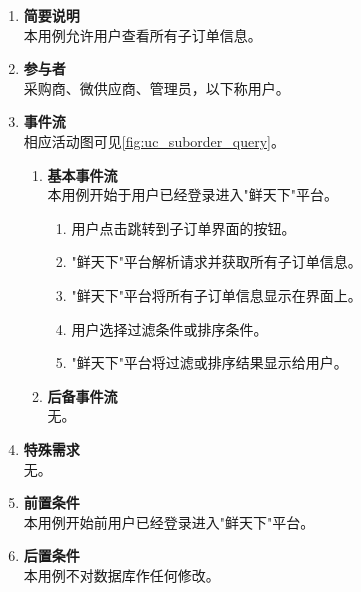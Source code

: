 \begin{enumerate}
    \item \textbf{简要说明}  \\ 本用例允许用户查看所有子订单信息。
    \item \textbf{参与者} \\ 采购商、微供应商、管理员，以下称用户。
    \item \textbf{事件流} \\ 相应活动图可见\autoref{fig:uc_suborder_query}。
    \begin{enumerate} 
        \item \textbf{基本事件流} \\ 本用例开始于用户已经登录进入"鲜天下"平台。
        \begin{enumerate}
            \item 用户点击跳转到子订单界面的按钮。

            \item "鲜天下"平台解析请求并获取所有子订单信息。

            \item "鲜天下"平台将所有子订单信息显示在界面上。

            \item 用户选择过滤条件或排序条件。
            
            \item "鲜天下"平台将过滤或排序结果显示给用户。

        \end{enumerate}

        \item \textbf{后备事件流}  \\ 无。
        
    \end{enumerate}
    \item \textbf{特殊需求} \\ 无。
    \item \textbf{前置条件} \\ 本用例开始前用户已经登录进入"鲜天下"平台。
    \item \textbf{后置条件} \\ 本用例不对数据库作任何修改。
\end{enumerate}




